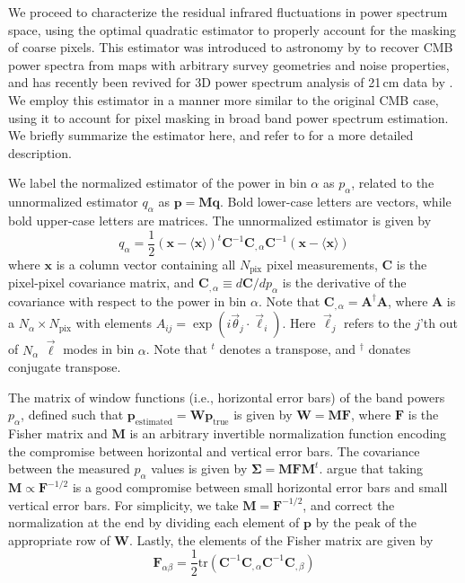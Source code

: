 \documentclass{emulateapj}
\newcommand{\Fb}{\mathbf{F}}
\newcommand{\Mb}{\mathbf{M}}
\newcommand{\Cb}{\mathbf{C}}
\newcommand{\Ab}{\mathbf{A}}
\newcommand{\xb}{\mathbf{x}}
\newcommand{\pb}{\mathbf{p}}
\newcommand{\Wb}{\mathbf{W}}
\begin{document}
We proceed to characterize the residual infrared fluctuations in power spectrum space, using the optimal quadratic estimator to properly account for the masking of coarse pixels. This estimator was introduced to astronomy by \citet{Maxpowerspeclossless} to recover CMB power spectra from maps with arbitrary survey geometries and noise properties, and has recently been revived for 3D power spectrum analysis of 21\,cm data by \citet{X13, dillonneben, LT11, DillonFast, ali15}. We employ this estimator in a manner more similar to the original CMB case, using it to account for pixel masking in broad band power spectrum estimation. We briefly summarize the estimator here, and refer to \citet{X13} for a more detailed description.

We label the normalized estimator of the power in bin $\alpha$ as $p_\alpha$, related to the unnormalized estimator $q_\alpha$ as $\mathbf{p} = \Mb \mathbf{q}$. Bold lower-case letters are vectors, while bold upper-case letters are matrices. The unnormalized estimator is given by
\begin{equation}
q_\alpha = \frac{1}{2}(\xb-\langle\xb\rangle)^t \Cb^{-1} \Cb_{,\alpha}\Cb^{-1}(\xb-\langle\xb\rangle)
\end{equation}
where $\xb$ is a column vector containing all $N_\text{pix}$ pixel measurements, $\Cb$ is the pixel-pixel covariance matrix, and $\Cb_{,\alpha}\equiv d\Cb/dp_\alpha$ is the derivative of the covariance with respect to the power in bin $\alpha$. Note that $\Cb_{,\alpha} = \Ab^\dagger\Ab$, where $\Ab$ is a $N_\alpha\times N_\text{pix}$ with elements $A_{ij}=\exp(i\vec{\theta}_j\cdot\vec{\ell}_i)$. Here $\vec{\ell}_j$ refers to the $j$'th out of $N_\alpha$ $\vec{\ell}$ modes in bin $\alpha$. Note that $^t$ denotes a transpose, and $^\dagger$ donates conjugate transpose.

The matrix of window functions (i.e., horizontal error bars) of the band powers $p_\alpha$, defined such that $\pb_\text{estimated}=\Wb\pb_\text{true}$ is given by $\Wb=\Mb\Fb$, where $\Fb$ is the Fisher matrix and $\Mb$ is an arbitrary invertible normalization function encoding the compromise between horizontal and vertical error bars. The covariance between the measured $p_\alpha$ values is given by $\mathbf{\Sigma} = \Mb\Fb\Mb^t$. \citet{X13} argue that taking $\Mb\propto \Fb^{-1/2}$ is a good compromise between small horizontal error bars and small vertical error bars. For simplicity, we take $\Mb=\Fb^{-1/2}$, and correct the normalization at the end by dividing each element of $\pb$ by the peak of the appropriate row of $\Wb$. Lastly, the elements of the Fisher matrix are given by
\begin{equation}
\Fb_{\alpha\beta}=\frac{1}{2}\text{tr}\left(\Cb^{-1} \Cb_{,\alpha} \Cb^{-1} \Cb_{,\beta} \right)	
\end{equation}
\end{document}
